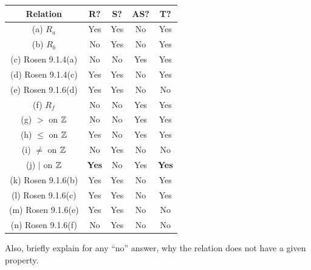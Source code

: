 \begin{questions}
\begin{solution}
\begin{tabular}{|c||c|c|c|c|}
	\hline 
		\textbf{Relation} & \textbf{R?} & \textbf{S?} & \textbf{AS?} & \textbf{T?} \\
	\hline 
		(a) $R_a$ 	&  \hspace{0.1in}Yes\hspace{0.1in} 
				& \hspace{0.1in}Yes\hspace{0.1in} 
				& \hspace{0.1in}No\hspace{0.1in} 
				&  \hspace{0.1in}Yes\hspace{0.1in} \\
		(b) $R_b$ 			& 	No & Yes & No & Yes \\
		(c) Rosen 9.1.4(a) 	& 	No & No & Yes & Yes \\
		(d) Rosen 9.1.4(c) 	& 	Yes & Yes & No & Yes \\
		(e) Rosen 9.1.6(d) 	&   Yes & Yes & No & No \\
		(f) $R_f$ 			& 	No	& No	& Yes	& Yes  \\
		(g) $>$ on $\mathbb{Z}$		&   No 	& No 	& Yes 	& Yes \\  %
		(h) $\leq$ on $\mathbb{Z}$  &  	Yes & No 	& Yes   & Yes \\  %
		(i) $\neq$ on $\mathbb{Z}$ 	& 	No  & Yes 	&   No 	& No \\  %
		(j) $|$ on $\mathbb{Z}$ 	&   \textbf{Yes} 	& No 	&   Yes & \textbf{Yes} \\   %
		(k) Rosen 9.1.6(b) 	&   Yes & Yes 	& No 	& Yes \\  
		(l) Rosen 9.1.6(c)  & Yes	& Yes 	& No 	& Yes \\
		(m) Rosen 9.1.6(e)  & Yes 	& Yes 	& No 	& No \\
		(n) Rosen 9.1.6(f) 	& No 	& Yes 	& No 	& No \\
	\hline 
\end{tabular}

Also, briefly explain for any ``no'' answer, why the relation does not have a given property. 


\end{solution}
\end{questions}
